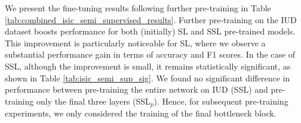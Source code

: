 \documentclass[a4paper,fleqn]{cas-dc}
\begin{document}

We present the fine-tuning results following further pre-training in Table \ref{tab:combined_isic_semi_supervised_results}. Further pre-training on the IUD dataset boosts performance for both (initially) SL and SSL pre-trained models. This improvement is particularly noticeable for SL, where we observe a substantial performance gain in terms of accuracy and F1 scores. In the case of SSL, although the improvement is small, it remains statistically significant, as shown in Table \ref{tab:isic_semi_sup_sig}.
We found no significant difference in performance between pre-training the entire network on IUD (SSL) and pre-training only the final three layers (SSL$_p$). Hence, for subsequent pre-training experiments, we only considered the training of the final bottleneck block. 
\end{document}
